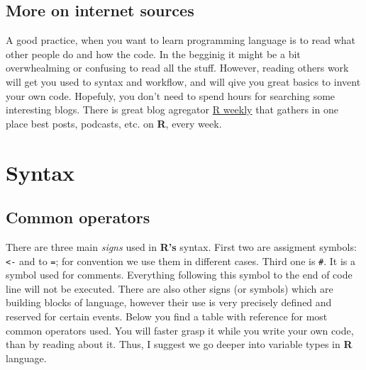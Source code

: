 \documentclass[]{book}
\theoremstyle{definition}
\theoremstyle{definition}
\theoremstyle{definition}
\theoremstyle{remark}
\begin{document}
\subsection{More on internet sources}\label{more-on-internet-sources}

A good practice, when you want to learn programming language is to read
what other people do and how the code. In the begginig it might be a bit
overwhealming or confusing to read all the stuff. However, reading
others work will get you used to syntax and workflow, and will qive you
great basics to invent your own code. Hopefuly, you don't need to spend
hours for searching some interesting blogs. There is great blog
agregator \href{https://rweekly.org}{R weekly} that gathers in one place
best posts, podcasts, etc. on \textbf{R}, every week.

\section{Syntax}\label{syntax}

\subsection{Common operators}\label{common-operators}

There are three main \emph{signs} used in \textbf{R's} syntax. First two
are assigment symbols: \texttt{\textless{}-} and to \texttt{=}; for
convention we use them in different cases. Third one is \texttt{\#}. It
is a symbol used for comments. Everything following this symbol to the
end of code line will not be executed. There are also other signs (or
symbols) which are building blocks of language, however their use is
very precisely defined and reserved for certain events. Below you find a
table with reference for most common operators used. You will faster
grasp it while you write your own code, than by reading about it. Thus,
I suggest we go deeper into variable types in \textbf{R} language.
\end{document}
